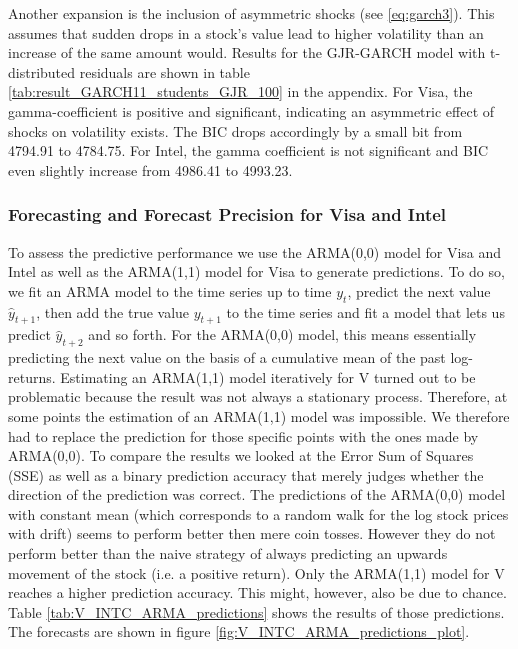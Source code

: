 %    
%    

Another expansion is the inclusion of asymmetric shocks (see \ref{eq:garch3}). This assumes that sudden drops in a stock's value lead to higher volatility than an increase of the same amount would. Results for the GJR-GARCH model with t-distributed residuals are shown in table \ref{tab:result_GARCH11_students_GJR_100} in the appendix. For Visa, the gamma-coefficient is positive and significant, indicating an asymmetric effect of shocks on volatility exists. The BIC drops accordingly by a small bit from 4794.91 to 4784.75. For Intel, the gamma coefficient is not significant and BIC even slightly increase from 4986.41 to 4993.23.

\subsubsection{Forecasting and Forecast Precision for Visa and Intel}
To assess the predictive performance we use the ARMA(0,0) model for Visa and Intel as well as the ARMA(1,1) model for Visa to generate predictions. To do so, we fit an ARMA model to the time series up to time $y_t$, predict the next value $\hat{y}_{t+1}$, then add the true value $y_{t+1}$ to the time series and fit a model that lets us predict $\hat{y}_{t + 2}$ and so forth. For the ARMA(0,0) model, this means essentially predicting the next value on the basis of a cumulative mean of the past log-returns. Estimating an ARMA(1,1) model iteratively for V turned out to be problematic because the result was not always a stationary process. Therefore, at some points the estimation of an ARMA(1,1) model was impossible. We therefore had to replace the prediction for those specific points with the ones made by ARMA(0,0). 
To compare the results we looked at the Error Sum of Squares (SSE) as well as a binary prediction accuracy that merely judges whether the direction of the prediction was correct. The predictions of the ARMA(0,0) model with constant mean (which corresponds to a random walk for the log stock prices with drift) seems to perform better then mere coin tosses. However they do not perform better than the naive strategy of always predicting an upwards movement of the stock (i.e. a positive return). Only the ARMA(1,1) model for V reaches a higher prediction accuracy. This might, however, also be due to chance. Table \ref{tab:V_INTC_ARMA_predictions} shows the results of those predictions. The forecasts are shown in figure \ref{fig:V_INTC_ARMA_predictions_plot}. 


